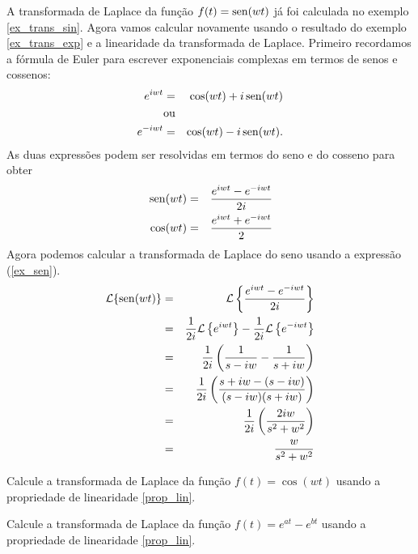 \begin{ex}{\label{ex_trans_sin_2}} A transformada de Laplace da função $f(t)=\operatorname{sen}(wt)$ já foi calculada no exemplo \ref{ex_trans_sin}. Agora vamos calcular novamente usando o resultado do exemplo \ref{ex_trans_exp} e a linearidade da transformada de Laplace. Primeiro recordamos a fórmula de Euler para escrever exponenciais complexas em termos de senos e cossenos:
\begin{eqnarray*}
e^{iwt}&=&\cos(wt)+i\operatorname{sen}(wt)\\
&\hbox{ou}&\\
e^{-iwt}&=&\cos(wt)-i\operatorname{sen}(wt) .
\end{eqnarray*}
As duas expressões podem ser resolvidas em termos do seno e do cosseno para obter
\begin{eqnarray}
{\label{ex_sen}} \operatorname{sen}(wt)&=&\frac{e^{iwt}-e^{-iwt}}{2i}\\
{\label{ex_cos}} \cos(wt)&=&\frac{e^{iwt}+e^{-iwt}}{2}
\end{eqnarray} 
Agora podemos calcular a transformada de Laplace do seno usando a expressão (\ref{ex_sen}).
\begin{eqnarray*}
\mathcal{L }\{\operatorname{sen}(wt)\}&=&\mathcal{L }\left\{\frac{e^{iwt}-e^{-iwt}}{2i}\right\}\\
&=&\frac{1}{2i} \mathcal{L }\left\{ e^{iwt}\right\}-\frac{1}{2i} \mathcal{L }\left\{ e^{-iwt}\right\}\\
&=&\frac{1}{2i}\left( \frac{1}{s-iw}- \frac{1}{s+iw}\right)\\
&=&\frac{1}{2i}\left( \frac{s+iw-(s-iw)}{(s-iw)(s+iw)}\right)\\
&=&\frac{1}{2i}\left( \frac{2iw}{s^2+w^2}\right)\\
&=&\frac{w}{s^2+w^2}
\end{eqnarray*} 

\end{ex}
\begin{prob}Calcule a transformada de Laplace da função $f(t)=\cos(wt)$ usando a propriedade de linearidade \ref{prop_lin}. 
\end{prob}
\begin{prob}Calcule a transformada de Laplace da função $f(t)=e^{at}-e^{bt}$ usando a propriedade de linearidade \ref{prop_lin}. 
\end{prob}
